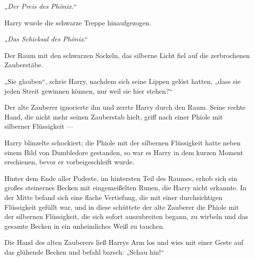 „\emph{Der Preis des Phönix.}“

Harry wurde die schwarze Treppe hinaufgezogen.

„\emph{Das Schicksal des Phönix}.“

Der Raum mit den schwarzen Sockeln, das silberne Licht fiel auf die zerbrochenen Zauberstäbe.

„Sie glauben“, schrie Harry, nachdem sich seine Lippen gelöst hatten, „dass sie jeden Streit gewinnen können, nur weil sie hier stehen?“

Der alte Zauberer ignorierte ihn und zerrte Harry durch den Raum. Seine rechte Hand, die nicht mehr seinen Zauberstab hielt, griff nach einer Phiole mit silberner Flüssigkeit —

Harry blinzelte schockiert; die Phiole mit der silbernen Flüssigkeit hatte neben einem Bild von Dumbledore gestanden, so war es Harry in dem kurzen Moment erschienen, bevor er vorbeigeschleift wurde.

Hinter dem Ende aller Podeste, im hintersten Teil des Raumes, erhob sich ein großes steinernes Becken mit eingemeißelten Runen, die Harry nicht erkannte. In der Mitte befand sich eine flache Vertiefung, die mit einer durchsichtigen Flüssigkeit gefüllt war, und in diese schüttete der alte Zauberer die Phiole mit der silbernen Flüssigkeit, die sich sofort auszubreiten begann, zu wirbeln und das gesamte Becken in ein unheimliches Weiß zu tauchen.

Die Hand des alten Zauberers ließ Harrys Arm los und wies mit einer Geste auf das glühende Becken und befahl barsch:
„Schau hin!“

